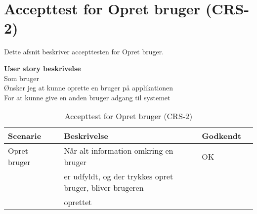 \section{Accepttest for Opret bruger (CRS-2)}
Dette afsnit beskriver accepttesten for Opret bruger.

\textbf{User story beskrivelse} \\
Som bruger \\
Ønsker jeg at kunne oprette en bruger på applikationen \\
For at kunne give en anden bruger adgang til systemet

\begin{table}[H]
	\centering
	\begin{tabular}{|ll|l|ll|} \hline
		\textbf{Scenarie} &  & \textbf{Beskrivelse}&  \textbf{Godkendt}&  \\ \hline
		Opret bruger&  &  Når alt information omkring en bruger &  OK&  \\
		& & er udfyldt, og der trykkes opret bruger, bliver brugeren     & & \\
		& & oprettet& & \\ \hline
	\end{tabular}
	\caption{Accepttest for Opret bruger (CRS-2)}
	\label{AcceptOpretBruger}
\end{table}

\clearpage